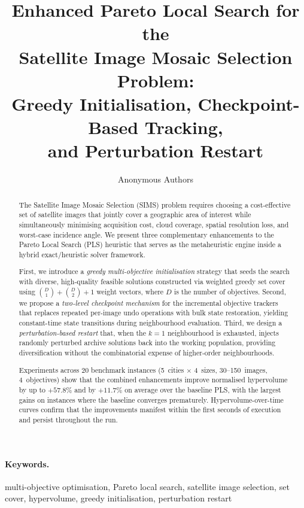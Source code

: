 \documentclass[11pt,a4paper]{article}
\title{%
  Enhanced Pareto Local Search for the\\
  Satellite Image Mosaic Selection Problem:\\
  Greedy Initialisation, Checkpoint-Based Tracking,\\
  and Perturbation Restart%
}
\author{%
  Anonymous Authors%
}
\date{}
\begin{document}
\maketitle

\begin{abstract}
The Satellite Image Mosaic Selection (SIMS) problem requires choosing a
cost-effective set of satellite images that jointly cover a geographic area
of interest while simultaneously minimising acquisition cost, cloud
coverage, spatial resolution loss, and worst-case incidence angle.  We
present three complementary enhancements to the Pareto Local Search (PLS)
heuristic that serves as the metaheuristic engine inside a hybrid
exact/heuristic solver framework.

First, we introduce a \emph{greedy multi-objective initialisation}
strategy that seeds the search with diverse, high-quality feasible
solutions constructed via weighted greedy set cover using
$\binom{D}{1}+\binom{D}{2}+1$ weight vectors, where $D$ is the number of
objectives.  Second, we propose a \emph{two-level checkpoint mechanism}
for the incremental objective trackers that replaces repeated per-image
undo operations with bulk state restoration, yielding constant-time
state transitions during neighbourhood evaluation.  Third, we design a
\emph{perturbation-based restart} that, when the $k{=}1$ neighbourhood is
exhausted, injects randomly perturbed archive solutions back into the
working population, providing diversification without the combinatorial
expense of higher-order neighbourhoods.

Experiments across 20 benchmark instances (5~cities $\times$ 4~sizes,
30--150~images, 4~objectives) show that the combined enhancements
improve normalised hypervolume by up to $+57.8\%$ and by $+11.7\%$ on
average over the baseline PLS, with the largest gains on instances where
the baseline converges prematurely.  Hypervolume-over-time curves confirm
that the improvements manifest within the first seconds of execution and
persist throughout the run.
\end{abstract}

\paragraph{Keywords.}
multi-objective optimisation, Pareto local search, satellite image
selection, set cover, hypervolume, greedy initialisation, perturbation
restart
\end{document}
